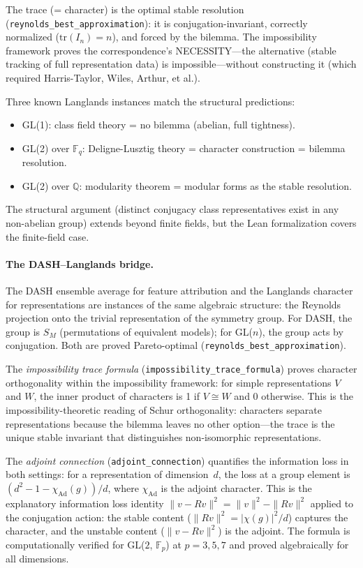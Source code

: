 \documentclass[11pt,a4paper]{article}
\begin{document}
The trace (= character) is the optimal stable resolution (\texttt{reynolds\_best\_approximation}): it is conjugation-invariant, correctly normalized ($\mathrm{tr}(I_n) = n$), and forced by the bilemma.  The impossibility framework proves the correspondence's NECESSITY---the alternative (stable tracking of full representation data) is impossible---without constructing it (which required Harris-Taylor, Wiles, Arthur, et al.).

Three known Langlands instances match the structural predictions:
\begin{itemize}
  \item GL(1): class field theory = no bilemma (abelian, full tightness).
  \item GL(2) over $\mathbb{F}_q$: Deligne-Lusztig theory = character construction = bilemma resolution.
  \item GL(2) over $\mathbb{Q}$: modularity theorem = modular forms as the stable resolution.
\end{itemize}
The structural argument (distinct conjugacy class representatives exist in any non-abelian group) extends beyond finite fields, but the Lean formalization covers the finite-field case.

\paragraph{The DASH--Langlands bridge.}
The DASH ensemble average for feature attribution and the Langlands character for representations are instances of the same algebraic structure: the Reynolds projection onto the trivial representation of the symmetry group.  For DASH, the group is $S_M$ (permutations of equivalent models); for GL($n$), the group acts by conjugation.  Both are proved Pareto-optimal (\texttt{reynolds\_best\_approximation}).

The \emph{impossibility trace formula} (\texttt{impossibility\_trace\_formula}) proves character orthogonality within the impossibility framework: for simple representations $V$ and $W$, the inner product of characters is 1 if $V \cong W$ and 0 otherwise.  This is the impossibility-theoretic reading of Schur orthogonality: characters separate representations because the bilemma leaves no other option---the trace is the unique stable invariant that distinguishes non-isomorphic representations.

The \emph{adjoint connection} (\texttt{adjoint\_connection}) quantifies the information loss in both settings: for a representation of dimension~$d$, the loss at a group element is $(d^2 - 1 - \chi_{\mathrm{Ad}}(g)) / d$, where $\chi_{\mathrm{Ad}}$ is the adjoint character.  This is the explanatory information loss identity $\|v - Rv\|^2 = \|v\|^2 - \|Rv\|^2$ applied to the conjugation action: the stable content ($\|Rv\|^2 = |\chi(g)|^2/d$) captures the character, and the unstable content ($\|v - Rv\|^2$) is the adjoint.  The formula is computationally verified for GL($2$, $\mathbb{F}_p$) at $p = 3, 5, 7$ and proved algebraically for all dimensions.
\end{document}
